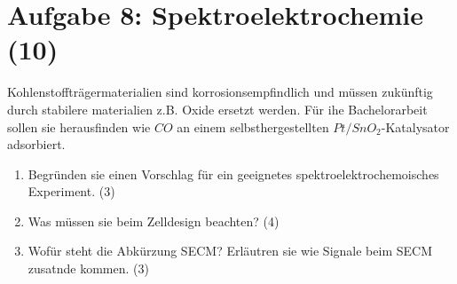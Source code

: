 \section*{Aufgabe 8: Spektroelektrochemie (10)}
Kohlenstoffträgermaterialien sind korrosionsempfindlich und müssen zukünftig durch
stabilere materialien z.B. Oxide ersetzt werden. Für ihe Bachelorarbeit sollen sie
herausfinden wie \(CO\) an einem selbsthergestellten \(Pt/SnO_2\)-Katalysator adsorbiert.

\begin{enumerate}

\item Begründen sie einen Vorschlag für ein geeignetes spektroelektrochemoisches Experiment.
(3)

\item Was müssen sie beim Zelldesign beachten? (4)

\item Wofür steht die Abkürzung SECM? Erläutren sie wie Signale beim SECM zusatnde
kommen. (3)

\end{enumerate}